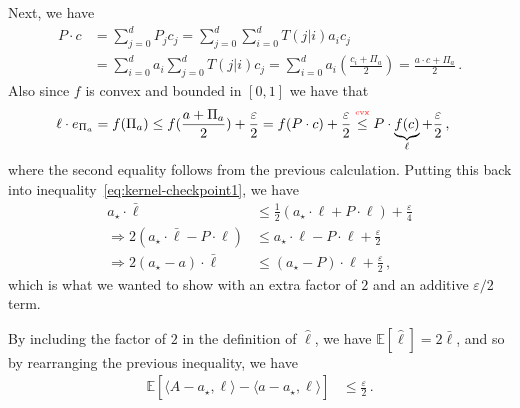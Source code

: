 \documentclass{article}
\theoremstyle{plain}
\theoremstyle{definition}
\renewcommand{\epsilon}{\varepsilon}
\newcommand{\E}{\mathbb E}
\newcommand{\abovelabel}[1]{\stackrel{\raisebox{0.5mm}{\textrm{\tiny \color{red} #1}}}}
\newcommand{\hl}{\hat{\ell}\xspace}
\begin{document}
Next, we have
\begin{align*}
    P \cdot c
     & = \sum_{j=0}^{d} P_j c_j
    =
    \sum_{j=0}^{d}
    \sum_{i=0}^{d}
    T(j | i) a_i c_j            \\
     & =
    \sum_{i=0}^{d}
    a_i
    \sum_{j=0}^{d}
    T(j | i) c_j
    =
    \sum_{i=0}^{d}
    a_i
    \left(
    \frac{c_i  + \Pi_a}{2}
    \right)
    = \frac{a \cdot c + \Pi_a}{2}\,.
\end{align*}
Also since $f$ is convex and bounded in $[0,1]$ we have that
\begin{align*}
    \ell \cdot e_{\Pi_a}
     & = f(\Pi_a)
    \leq
    f( \frac{a + \Pi_a}{2}) + \frac{\epsilon}{2}
    =
    f(P \cdot c) + \frac{\epsilon}{2}
    \abovelabel{cvx}
    \leq
    P \cdot \underbrace{f(c)}_{\ell} + \frac{\epsilon}{2}\,,
\end{align*}
where the second equality follows from the previous calculation.
Putting this back into inequality~\ref{eq:kernel-checkpoint1}, we have
\begin{align*}
    a_\star \cdot \bar{\ell}
     & \leq
    \frac12
    (
    a_{\star} \cdot \ell
    +
    P \cdot \ell
    )
    + \frac{\epsilon}{4}
    \\
    \Rightarrow
    2\left(
    a_\star \cdot \bar{\ell}
    -
    P \cdot \ell
    \right)
     & \leq
    a_{\star} \cdot \ell
    -
    P \cdot \ell
    + \frac{\epsilon}{2}
    \\
    \Rightarrow
    2
    (a_\star - a) \cdot \bar{\ell}
     & \leq
    (a_{\star} - P) \cdot \ell
    + \frac{\epsilon}{2}
    \,,
\end{align*}
which is what we wanted to show with an extra factor of $2$ and an additive $\epsilon/2$ term.

By including the factor of $2$ in the definition of $\hl$,
we have $\E[\hl] = 2 \bar{\ell}$, and so by rearranging the previous inequality, we have
\begin{align*}
    \E\!\left[
        \langle A - a_\star, \ell \rangle
        - \langle a - a_\star, \hl \rangle
        \right]
     & \leq
    \frac{\epsilon}{2}\,.
\end{align*}
\end{document}
